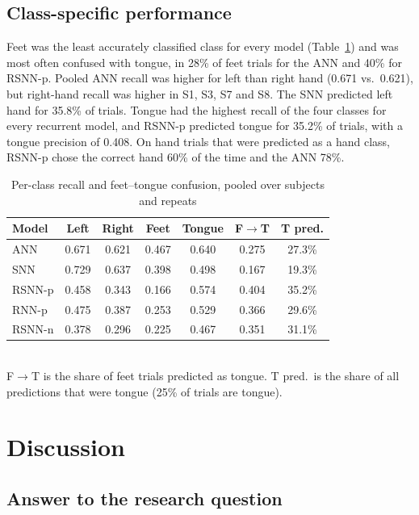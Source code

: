 \documentclass[conference]{IEEEtran}
\begin{document}
\subsection{Class-specific performance}

Feet was the least accurately classified class for every model (Table~\ref{tab:class}) and was most often confused with tongue, in 28\% of feet trials for the ANN and 40\% for RSNN-p. Pooled ANN recall was higher for left than right hand (0.671 vs.\ 0.621), but right-hand recall was higher in S1, S3, S7 and S8. The SNN predicted left hand for 35.8\% of trials. Tongue had the highest recall of the four classes for every recurrent model, and RSNN-p predicted tongue for 35.2\% of trials, with a tongue precision of 0.408. On hand trials that were predicted as a hand class, RSNN-p chose the correct hand 60\% of the time and the ANN 78\%.

\begin{table}[!t]
  \centering
  \caption{Per-class recall and feet--tongue confusion, pooled over subjects and repeats}
  \label{tab:class}
  \setlength{\tabcolsep}{4pt}
  \begin{tabular}{lcccccc}
    \toprule
    Model & Left & Right & Feet & Tongue & F$\to$T & T pred. \\
    \midrule
    ANN    & 0.671 & 0.621 & 0.467 & 0.640 & 0.275 & 27.3\% \\
    SNN    & 0.729 & 0.637 & 0.398 & 0.498 & 0.167 & 19.3\% \\
    RSNN-p & 0.458 & 0.343 & 0.166 & 0.574 & 0.404 & 35.2\% \\
    RNN-p  & 0.475 & 0.387 & 0.253 & 0.529 & 0.366 & 29.6\% \\
    RSNN-n & 0.378 & 0.296 & 0.225 & 0.467 & 0.351 & 31.1\% \\
    \bottomrule
  \end{tabular}
  \\[2pt]
  \footnotesize F$\to$T is the share of feet trials predicted as tongue. T pred.\ is the share of all predictions that were tongue (25\% of trials are tongue).
\end{table}

\section{Discussion}

\subsection{Answer to the research question}
\end{document}
